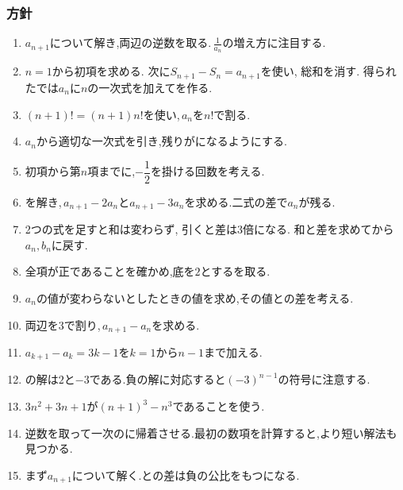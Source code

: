       \subsubsection{方針}\label{節：標準難易度：方針}\label{節：基本と応用から出題されるもの：方針}
        \begin{enumerate}[label=\textbf{問\arabic*.},leftmargin=3.8em,format=\bookitemlink{practice-basic}{hint}{problem}]
          \item $a_{n+1}$について解き,両辺の逆数を取る.\,$\displaystyle \frac{1}{a_n}$の増え方に注目する.
          \item $n=1$から初項を求める. 次に$S_{n+1}-S_n=a_{n+1}$を使い, 総和を消す. 得られたでは$a_n$に$n$の一次式を加えてを作る.
          \item $(n+1)!=(n+1)n!$を使い,\,$a_n$を$n!$で割る.
          \item $a_n$から適切な一次式を引き,残りがになるようにする.
          \item 初項から第$n$項までに,$-\dfrac12$を掛ける回数を考える.
          \item {}を解き,\,$a_{n+1}-2a_n$と$a_{n+1}-3a_n$を求める.二式の差で$a_n$が残る.
          \item 2つの式を足すと和は変わらず, 引くと差は3倍になる. 和と差を求めてから$a_n,b_n$に戻す.
          \item 全項が正であることを確かめ,底を$2$とするを取る.
          \item $a_n$の値が変わらないとしたときの値を求め,その値との差を考える.
          \item 両辺を$3$で割り,\,$a_{n+1}-a_n$を求める.
          \item $a_{k+1}-a_k=3k-1$を$k=1$から$n-1$まで加える.
          \item {}の解は$2$と$-3$である.負の解に対応すると$(-3)^{n-1}$の符号に注意する.
          \item $3n^2+3n+1$が$(n+1)^3-n^3$であることを使う.
          \item 逆数を取って一次のに帰着させる.最初の数項を計算すると,より短い解法も見つかる.
          \item まず$a_{n+1}$について解く.との差は負の公比をもつになる.

\end{enumerate}
